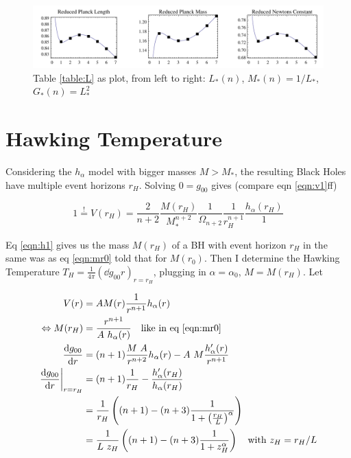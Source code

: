 \documentclass[10pt,a4paper, fleqn]{article}
\begin{document}
\begin{figure}[h]
\center%
\includegraphics[width=\textwidth]{mathematica/table-graphs.pdf}
\caption{Table \ref{table:L} as plot, from left to right: $L_*(n)$, $M_*(n)=1/L_*$, $G_*(n)=L_*^2$}\label{fig:extremal}
\end{figure}

\section{Hawking Temperature}
Considering the $h_\alpha$ model with bigger masses $M>M_*$, the resulting Black Holes have multiple event horizons $r_H$. Solving $0=g_{00}$ gives (compare eqn \ref{eqn:v1}ff)

\begin{equation}
1 \stackrel{!}{=}  V(r_H) 
   = \frac{2}{n+2} \frac{M(r_H)}{M_*^{n+2}} \frac{1}{\Omega_{n+2}}\frac{1}{r_H^{n+1}}  \frac{h_\alpha(r_H)}{1} \label{eqn:h1}
\end{equation}

Eq \ref{eqn:h1} gives us the mass $M(r_H)$ of a BH with event horizon $r_H$ in the same was as eq \ref{eqn:mr0} told that for $M(r_0)$. Then I determine the Hawking Temperature $T_H = \frac{1}{4\pi} \left( \dd{g_{00}}r \right)_{r=r_H}$, plugging in $\alpha=\alpha_0$, $M=M(r_H)$. Let

\begin{align}
\label{hh1} V(r) &= A M(r) \frac{1}{r^{n+1}} h_\alpha(r) \\
\label{hh2} \Leftrightarrow M(r_H) &= \frac{r^{n+1}}{A ~h_\alpha(r)}
\quad\text{like in eq \ref{eqn:mr0}} \\
\label{hh3} \frac{\mathrm{d} g_{00}}{\mathrm{d} r} &= (n+1)\frac{M~A}{r^{n+2}} h_\alpha(r) - A~M\frac{h'_\alpha(r)}{r^{n+1}} \\
\label{hh4} \left.\frac{\mathrm{d} g_{00}}{\mathrm{d} r}\right|_{r=r_H} &= (n+1)\frac{1}{r_H} - \frac {h'_\alpha(r_H)}{h_\alpha(r_H)} \\
\label{hh5} &= \frac{1}{r_H} \left( 
 (n+1) - (n+3) \frac{1}{1+\left(\frac{r_H}{L}\right)^\alpha} \right) \\
\label{hh6} &= \frac{1}{L~z_H} \left( (n+1) - (n+3) \frac{1}{1+z_H^\alpha} \right)
\quad\text{with }z_H=r_H/L
\end{align}
\end{document}
